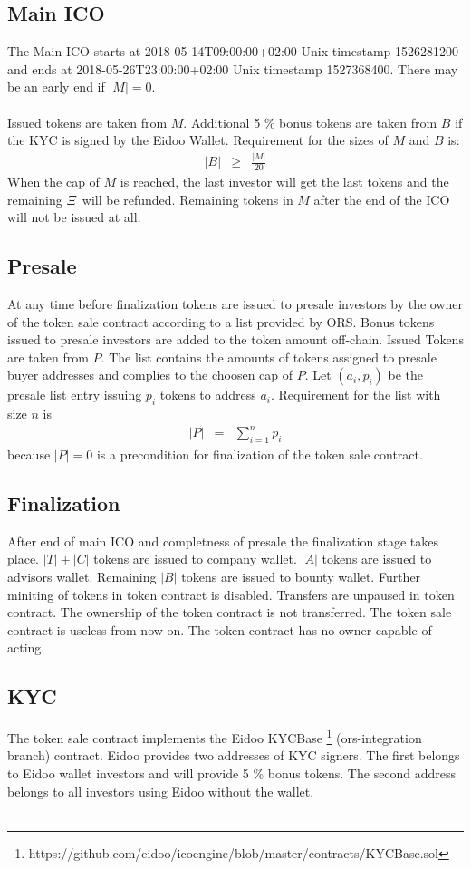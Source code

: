 \documentclass{article}
\newcommand{\ether}{$\Xi$}
\begin{document}
\subsection{Main ICO}
The Main ICO starts at 2018-05-14T09:00:00+02:00 Unix timestamp
1526281200 and ends at
2018-05-26T23:00:00+02:00 Unix timestamp 1527368400. There may be an early end
if $|M| = 0$.
\\\\ Issued tokens are taken from $M$. Additional 5 \% bonus tokens are taken
from $B$ if the KYC is signed by the Eidoo Wallet. Requirement for the sizes of
$M$ and $B$ is:
\begin{eqnarray}
  |B| & \geq & \frac{|M|}{20} 
  \end{eqnarray}
When the cap of $M$ is
reached, the last investor will get the last tokens and the remaining \ether \
will be refunded.
Remaining tokens in $M$ after the end of the ICO will not be issued at all.
\subsection{Presale}
At any time before finalization tokens are issued to
presale investors by the owner of the token sale contract according to a list
provided by ORS. Bonus tokens issued to presale investors are added to the token
amount off-chain. Issued Tokens are taken from $P$.
The list contains the amounts of tokens
assigned to presale buyer addresses and complies to the choosen cap of
$P$. Let $(a_i,p_i)$ be the presale list entry issuing $p_i$ tokens to address $a_i$.
Requirement for the list with size $n$
is
\begin{eqnarray}
     |P| & = & \sum_{i=1}^n  p_i 
  \end{eqnarray}
because $|P| = 0$ is a precondition for finalization of the token sale contract.


\subsection{Finalization}
After end of main ICO and completness of  presale the
finalization stage takes place. $|T|+|C|$ tokens are issued to company wallet.
$|A|$ tokens are issued to advisors wallet. Remaining $|B|$ tokens are issued to
bounty wallet. Further miniting of tokens in token contract is disabled.
Transfers are unpaused in token contract. The ownership of the token contract is not
transferred. The token sale contract is useless from now on. The token contract
has no owner capable of acting.
\subsection{KYC}
The token sale contract implements the Eidoo KYCBase
\footnote{https://github.com/eidoo/icoengine/blob/master/contracts/KYCBase.sol}
(ors-integration branch) contract. Eidoo provides two addresses of KYC signers.
The first belongs to Eidoo wallet investors and will provide 5 \% bonus tokens. The second address belongs to all investors using Eidoo without the wallet. \\\\
\end{document}
